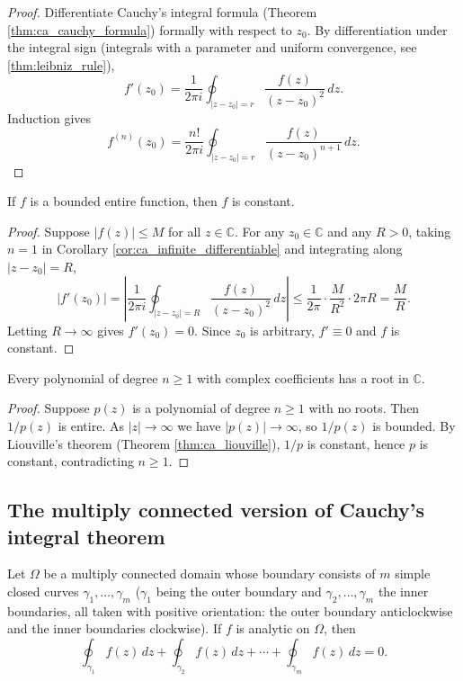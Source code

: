 \begin{proof}
Differentiate Cauchy's integral formula (Theorem \ref{thm:ca_cauchy_formula}) formally with respect to $z_0$. By differentiation under the integral sign (integrals with a parameter and uniform convergence, see \cref{thm:leibniz_rule}),
\[
f'(z_0) = \frac{1}{2\pi i} \oint_{|z - z_0| = r} \frac{f(z)}{(z - z_0)^2} \, dz.
\]
Induction gives
\[
f^{(n)}(z_0) = \frac{n!}{2\pi i} \oint_{|z - z_0| = r} \frac{f(z)}{(z - z_0)^{n+1}} \, dz.
\]
\end{proof}

\begin{theorem}\label{thm:ca_liouville}
If $f$ is a bounded entire function, then $f$ is constant.
\end{theorem}

\begin{proof}
Suppose $|f(z)| \le M$ for all $z \in \mathbb{C}$. For any $z_0 \in \mathbb{C}$ and any $R > 0$, taking $n = 1$ in Corollary \ref{cor:ca_infinite_differentiable} and integrating along $|z - z_0| = R$,
\[
|f'(z_0)| = \left| \frac{1}{2\pi i} \oint_{|z - z_0| = R} \frac{f(z)}{(z - z_0)^2} \, dz \right| \le \frac{1}{2\pi} \cdot \frac{M}{R^2} \cdot 2\pi R = \frac{M}{R}.
\]
Letting $R \to \infty$ gives $f'(z_0) = 0$. Since $z_0$ is arbitrary, $f' \equiv 0$ and $f$ is constant.
\end{proof}

\begin{corollary}\label{cor:ca_fundamental_theorem_algebra}
Every polynomial of degree $n \ge 1$ with complex coefficients has a root in $\mathbb{C}$.
\end{corollary}

\begin{proof}
Suppose $p(z)$ is a polynomial of degree $n \ge 1$ with no roots. Then $1/p(z)$ is entire. As $|z| \to \infty$ we have $|p(z)| \to \infty$, so $1/p(z)$ is bounded. By Liouville's theorem (Theorem \ref{thm:ca_liouville}), $1/p$ is constant, hence $p$ is constant, contradicting $n \ge 1$.
\end{proof}

\subsection{The multiply connected version of Cauchy's integral theorem}

\begin{theorem}\label{thm:ca_cauchy_multiply_connected}
Let $\Omega$ be a multiply connected domain whose boundary consists of $m$ simple closed curves $\gamma_1, \dots, \gamma_m$ ($\gamma_1$ being the outer boundary and $\gamma_2, \dots, \gamma_m$ the inner boundaries, all taken with positive orientation: the outer boundary anticlockwise and the inner boundaries clockwise). If $f$ is analytic on $\Omega$, then
\[
\oint_{\gamma_1} f(z) \, dz + \oint_{\gamma_2} f(z) \, dz + \cdots + \oint_{\gamma_m} f(z) \, dz = 0.
\]
\end{theorem}

